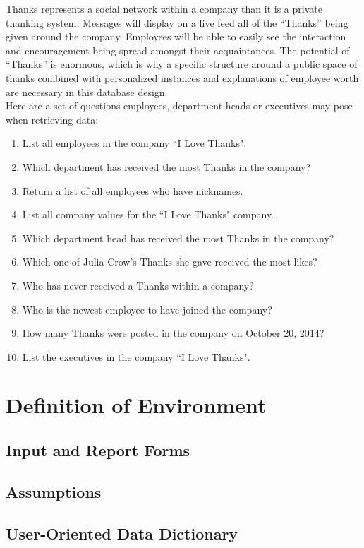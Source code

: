 \documentclass[11pt]{report}
\begin{document}
Thanks represents a social network within a company than it is a private thanking system. Messages will display on a live feed all of the “Thanks” being given around the company. Employees will be able to easily see the interaction and encouragement being spread amongst their acquaintances. The potential of “Thanks” is enormous, which is why a specific structure around a public space of thanks combined with personalized instances and explanations of employee worth are necessary in this database design.\\

\clearpage
Here are a set of questions employees, department heads or executives may pose when retrieving data:
\begin{enumerate}
    \item List all employees in the company ``I Love Thanks".
    \item Which department has received the most Thanks in the company?
    \item Return a list of all employees who have nicknames.
    \item List all company values for the ``I Love Thanks" company.
    \item Which department head has received the most Thanks in the company?
    \item Which one of Julia Crow's Thanks she gave received the most likes?
    \item Who has never received a Thanks within a company?
    \item Who is the newest employee to have joined the company?
    \item How many Thanks were posted in the company on October 20, 2014?
    \item List the executives in the company ``I Love Thanks".
\end{enumerate}

\chapter{Definition of Environment}

\section{Input and Report Forms}
\section{Assumptions}
\section{User-Oriented Data Dictionary}
\end{document}
